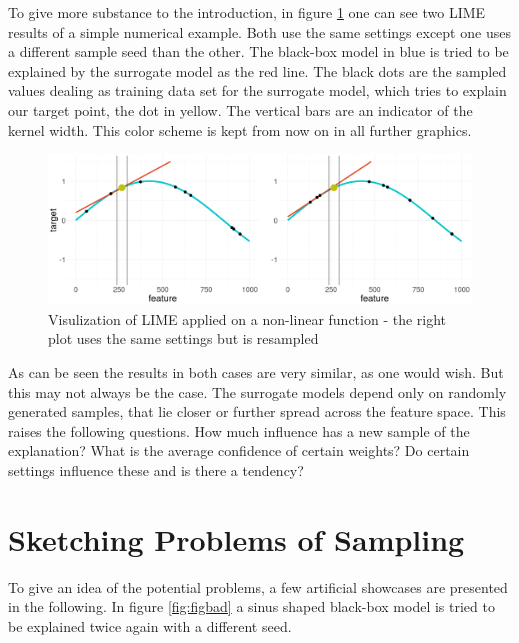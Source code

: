 \documentclass[
]{krantz}
\begin{document}
To give more substance to the introduction, in figure \ref{fig:figbasic} one can see two LIME results of a simple numerical example.
Both use the same settings except one uses a different sample seed than the other.
The black-box model in blue is tried to be explained by the surrogate model as the red line.
The black dots are the sampled values dealing as training data set for the surrogate model, which tries to explain our target point, the dot in yellow.
The vertical bars are an indicator of the kernel width.
This color scheme is kept from now on in all further graphics.

\begin{figure}

{\centering \includegraphics[width=19.44in]{images/convex_samples_1vs2} 

}

\caption{Visulization of LIME applied on a non-linear function - the right plot uses the same settings but is resampled}\label{fig:figbasic}
\end{figure}

As can be seen the results in both cases are very similar, as one would wish.
But this may not always be the case.
The surrogate models depend only on randomly generated samples, that lie closer or further spread across the feature space. This raises the following questions.
How much influence has a new sample of the explanation?
What is the average confidence of certain weights?
Do certain settings influence these and is there a tendency?

\hypertarget{sketching-problems-of-sampling}{%
\section{Sketching Problems of Sampling}\label{sketching-problems-of-sampling}}

To give an idea of the potential problems, a few artificial showcases are presented in the following.
In figure \ref{fig:figbad} a sinus shaped black-box model is tried to be explained twice again with a different seed.
\end{document}
